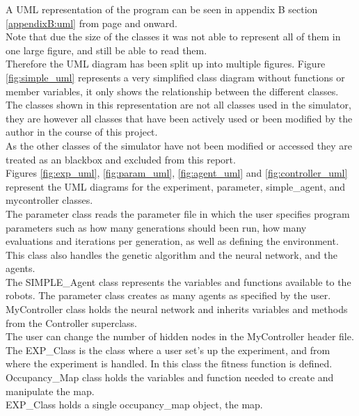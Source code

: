 A UML representation of the program can be seen in appendix B section \ref{appendixB:uml} from page \pageref{appendixB:uml} and onward. \\
Note that due the size of the classes it was not able to represent all of them in one large figure, and still be able to read them.\\
Therefore the UML diagram has been split up into multiple figures. 
Figure \ref{fig:simple_uml} represents a very simplified class diagram without functions or member variables, it only shows the relationship between the different classes.\\
The classes shown in this representation are not all classes used in the simulator, they are however all classes that have been actively used or been modified by the author in the course of this project.\\
As the other classes of the simulator have not been modified or accessed they are treated as an blackbox and excluded from this report.\\
Figures \ref{fig:exp_uml}, \ref{fig:param_uml}, \ref{fig:agent_uml} and \ref{fig:controller_uml} represent the UML diagrams for the experiment, parameter, simple\_agent, and mycontroller classes.\\

The parameter class reads the parameter file in which the user specifies program parameters such as how many generations should been run, how many evaluations and iterations per generation, as well as defining the environment.\\
This class also handles the genetic algorithm and the neural network, and the agents.\\
The SIMPLE\_Agent class represents the variables and functions available to the robots. The parameter class creates as many agents as specified by the user.\\

MyController class holds the neural network and inherits variables and methods from the Controller superclass.\\
The user can change the number of hidden nodes in the MyController header file. \\
The EXP\_Class is the class where a user set's up the experiment, and from where the experiment is handled. In this class the fitness function is defined.\\
Occupancy\_Map class holds the variables and function needed to create and manipulate the map.\\
EXP\_Class holds a single occupancy\_map object, the map.

